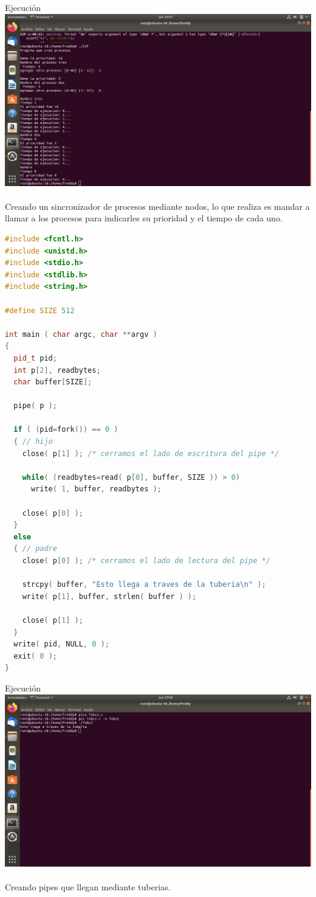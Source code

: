 \documentclass[11pt,a4paper]{report}
\begin{document}
\clearpage
Ejecuci\'on\\
\includegraphics[scale=.35]{sjf.png}
\\
\\
Creando un sincronizador de procesos mediante nodos, lo que realiza es mandar a llamar a los procesos para indicarles su prioridad y el tiempo de cada uno.
\clearpage
\begin{lstlisting}[language=C++, caption={Tubc2}]
#include <fcntl.h>
#include <unistd.h>
#include <stdio.h>
#include <stdlib.h>
#include <string.h>

#define SIZE 512

int main ( char argc, char **argv )
{
  pid_t pid;
  int p[2], readbytes;
  char buffer[SIZE];

  pipe( p );

  if ( (pid=fork()) == 0 )
  { // hijo
    close( p[1] ); /* cerramos el lado de escritura del pipe */

    while( (readbytes=read( p[0], buffer, SIZE )) > 0)
      write( 1, buffer, readbytes );

    close( p[0] );
  }
  else
  { // padre
    close( p[0] ); /* cerramos el lado de lectura del pipe */

    strcpy( buffer, "Esto llega a traves de la tuberia\n" );
    write( p[1], buffer, strlen( buffer ) );

    close( p[1] );
  }
  write( pid, NULL, 0 );
  exit( 0 );
}
\end{lstlisting}
\clearpage
Ejecuci\'on\\
\includegraphics[scale=.35]{tubc2.png}
\\
\\
Creando pipes que llegan mediante tuberias.
\end{document}
